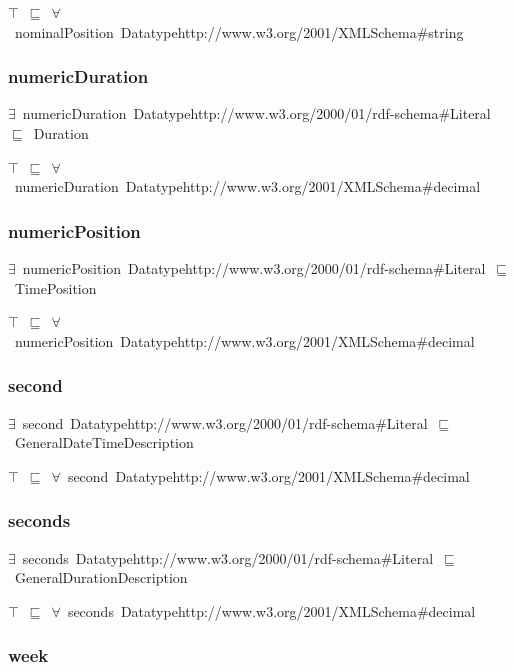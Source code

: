 \documentclass{article}
\begin{document}
\ensuremath{\top}~\ensuremath{\sqsubseteq}~\ensuremath{\forall}~nominalPosition~Datatypehttp://www.w3.org/2001/XMLSchema#string

\subsubsection*{numericDuration}

\ensuremath{\exists}~numericDuration~Datatypehttp://www.w3.org/2000/01/rdf-schema#Literal~\ensuremath{\sqsubseteq}~Duration

\ensuremath{\top}~\ensuremath{\sqsubseteq}~\ensuremath{\forall}~numericDuration~Datatypehttp://www.w3.org/2001/XMLSchema#decimal

\subsubsection*{numericPosition}

\ensuremath{\exists}~numericPosition~Datatypehttp://www.w3.org/2000/01/rdf-schema#Literal~\ensuremath{\sqsubseteq}~TimePosition

\ensuremath{\top}~\ensuremath{\sqsubseteq}~\ensuremath{\forall}~numericPosition~Datatypehttp://www.w3.org/2001/XMLSchema#decimal

\subsubsection*{second}

\ensuremath{\exists}~second~Datatypehttp://www.w3.org/2000/01/rdf-schema#Literal~\ensuremath{\sqsubseteq}~GeneralDateTimeDescription

\ensuremath{\top}~\ensuremath{\sqsubseteq}~\ensuremath{\forall}~second~Datatypehttp://www.w3.org/2001/XMLSchema#decimal

\subsubsection*{seconds}

\ensuremath{\exists}~seconds~Datatypehttp://www.w3.org/2000/01/rdf-schema#Literal~\ensuremath{\sqsubseteq}~GeneralDurationDescription

\ensuremath{\top}~\ensuremath{\sqsubseteq}~\ensuremath{\forall}~seconds~Datatypehttp://www.w3.org/2001/XMLSchema#decimal

\subsubsection*{week}
\end{document}
